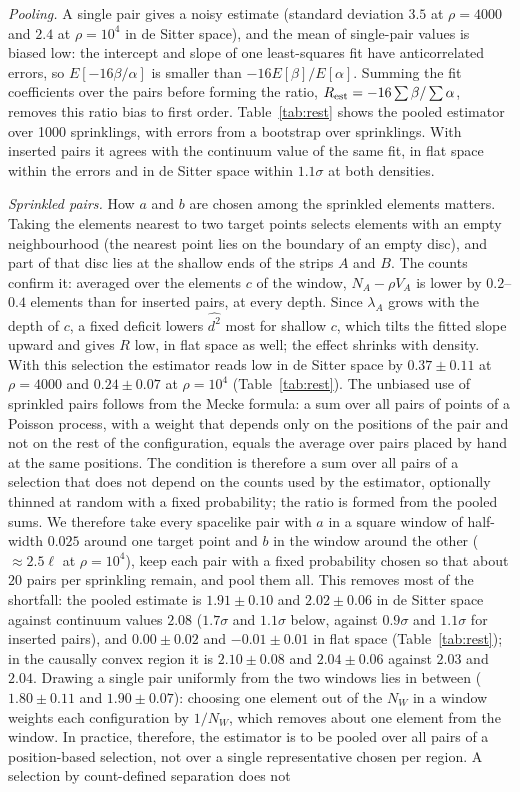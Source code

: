 \documentclass[prd,twocolumn,superscriptaddress,nofootinbib,amsmath,amssymb,floatfix]{revtex4-2}
\begin{document}
\emph{Pooling.} A single pair gives a noisy estimate (standard deviation $3.5$ at $\rho=4000$ and $2.4$ at $\rho=10^4$ in de Sitter space), and the mean of single-pair values is biased low: the intercept and slope of one least-squares fit have anticorrelated errors, so $E[-16\beta/\alpha]$ is smaller than $-16E[\beta]/E[\alpha]$. Summing the fit coefficients over the pairs before forming the ratio, $R_{\rm est}=-16\sum\beta/\sum\alpha$, removes this ratio bias to first order. Table~\ref{tab:rest} shows the pooled estimator over 1000 sprinklings, with errors from a bootstrap over sprinklings. With inserted pairs it agrees with the continuum value of the same fit, in flat space within the errors and in de Sitter space within $1.1\sigma$ at both densities.

\emph{Sprinkled pairs.} How $a$ and $b$ are chosen among the sprinkled elements matters. Taking the elements nearest to two target points selects elements with an empty neighbourhood (the nearest point lies on the boundary of an empty disc), and part of that disc lies at the shallow ends of the strips $A$ and $B$. The counts confirm it: averaged over the elements $c$ of the window, $N_A-\rho V_A$ is lower by $0.2$--$0.4$ elements than for inserted pairs, at every depth. Since $\lambda_A$ grows with the depth of $c$, a fixed deficit lowers $\widehat{d^2}$ most for shallow $c$, which tilts the fitted slope upward and gives $R$ low, in flat space as well; the effect shrinks with density. With this selection the estimator reads low in de Sitter space by $0.37\pm0.11$ at $\rho=4000$ and $0.24\pm0.07$ at $\rho=10^4$ (Table~\ref{tab:rest}). The unbiased use of sprinkled pairs follows from the Mecke formula: a sum over all pairs of points of a Poisson process, with a weight that depends only on the positions of the pair and not on the rest of the configuration, equals the average over pairs placed by hand at the same positions. The condition is therefore a sum over all pairs of a selection that does not depend on the counts used by the estimator, optionally thinned at random with a fixed probability; the ratio is formed from the pooled sums. We therefore take every spacelike pair with $a$ in a square window of half-width $0.025$ around one target point and $b$ in the window around the other ($\approx2.5\ell$ at $\rho=10^4$), keep each pair with a fixed probability chosen so that about $20$ pairs per sprinkling remain, and pool them all. This removes most of the shortfall: the pooled estimate is $1.91\pm0.10$ and $2.02\pm0.06$ in de Sitter space against continuum values $2.08$ ($1.7\sigma$ and $1.1\sigma$ below, against $0.9\sigma$ and $1.1\sigma$ for inserted pairs), and $0.00\pm0.02$ and $-0.01\pm0.01$ in flat space (Table~\ref{tab:rest}); in the causally convex region it is $2.10\pm0.08$ and $2.04\pm0.06$ against $2.03$ and $2.04$. Drawing a single pair uniformly from the two windows lies in between ($1.80\pm0.11$ and $1.90\pm0.07$): choosing one element out of the $N_W$ in a window weights each configuration by $1/N_W$, which removes about one element from the window. In practice, therefore, the estimator is to be pooled over all pairs of a position-based selection, not over a single representative chosen per region. A selection by count-defined separation does not 
\end{document}
